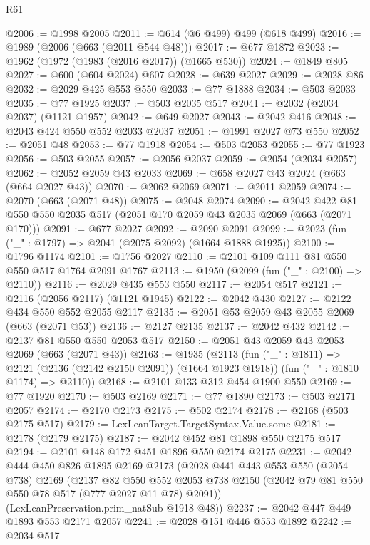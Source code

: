 \begin{lexlean}{R61}
\begin{coremodule}
@2006 := @1998 @2005
@2011 := @614 (@6 @499) @499 (@618 @499)
@2016 := @1989 (@2006 (@663 (@2011 @544 @48)))
@2017 := @677 @1872
@2023 := @1962 (@1972 (@1983 (@2016 @2017)) (@1665 @530))
@2024 := @1849 @805
@2027 := @600 (@604 @2024) @607
@2028 := @639 @2027
@2029 := @2028 @86
@2032 := @2029 @425 @553 @550
@2033 := @77 @1888
@2034 := @503 @2033
@2035 := @77 @1925
@2037 := @503 @2035 @517
@2041 := @2032 (@2034 @2037) (@1121 @1957)
@2042 := @649 @2027
@2043 := @2042 @416
@2048 := @2043 @424 @550 @552 @2033 @2037
@2051 := @1991 @2027 @73 @550
@2052 := @2051 @48
@2053 := @77 @1918
@2054 := @503 @2053
@2055 := @77 @1923
@2056 := @503 @2055
@2057 := @2056 @2037
@2059 := @2054 (@2034 @2057)
@2062 := @2052 @2059 @43 @2033
@2069 := @658 @2027 @43 @2024 (@663 (@664 @2027 @43))
@2070 := @2062 @2069
@2071 := @2011 @2059
@2074 := @2070 (@663 (@2071 @48))
@2075 := @2048 @2074
@2090 := @2042 @422 @81 @550 @550 @2035 @517 (@2051 @170 @2059 @43 @2035 @2069 (@663 (@2071 @170)))
@2091 := @677 @2027
@2092 := @2090 @2091
@2099 := @2023 (fun ("_" : @1797) => @2041 (@2075 @2092) (@1664 @1888 @1925))
@2100 := @1796 @1174
@2101 := @1756 @2027
@2110 := @2101 @109 @111 @81 @550 @550 @517 @1764 @2091 @1767
@2113 := @1950 (@2099 (fun ("_" : @2100) => @2110))
@2116 := @2029 @435 @553 @550
@2117 := @2054 @517
@2121 := @2116 (@2056 @2117) (@1121 @1945)
@2122 := @2042 @430
@2127 := @2122 @434 @550 @552 @2055 @2117
@2135 := @2051 @53 @2059 @43 @2055 @2069 (@663 (@2071 @53))
@2136 := @2127 @2135
@2137 := @2042 @432
@2142 := @2137 @81 @550 @550 @2053 @517
@2150 := @2051 @43 @2059 @43 @2053 @2069 (@663 (@2071 @43))
@2163 := @1935
    (@2113
      (fun ("_" : @1811) => @2121 (@2136 (@2142 @2150 @2091)) (@1664 @1923 @1918))
      (fun ("_" : @1810 @1174) => @2110))
@2168 := @2101 @133 @312 @454 @1900 @550
@2169 := @77 @1920
@2170 := @503 @2169
@2171 := @77 @1890
@2173 := @503 @2171 @2057
@2174 := @2170 @2173
@2175 := @502 @2174
@2178 := @2168 (@503 @2175 @517)
@2179 := LexLeanTarget.TargetSyntax.Value.some
@2181 := @2178 (@2179 @2175)
@2187 := @2042 @452 @81 @1898 @550 @2175 @517
@2194 := @2101 @148 @172 @451 @1896 @550 @2174 @2175
@2231 := @2042
    @444
    @450
    @826
    @1895
    @2169
    @2173
    (@2028
      @441
      @443
      @553
      @550
      (@2054 @738)
      @2169
      (@2137
        @82
        @550
        @552
        @2053
        @738
        @2150
        (@2042 @79 @81 @550 @550 @78 @517 (@777 @2027 @11 @78) @2091))
      (LexLeanPreservation.prim_natSub @1918 @48))
@2237 := @2042 @447 @449 @1893 @553 @2171 @2057
@2241 := @2028 @151 @446 @553 @1892
@2242 := @2034 @517

\end{coremodule}
\end{lexlean}
